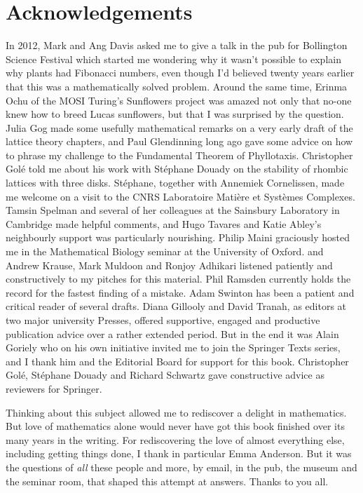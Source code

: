 

\chapter*{Acknowledgements}

In 2012, Mark and Ang Davis asked me to give a talk in the pub for Bollington Science Festival which started me wondering why it wasn't possible to explain why plants had Fibonacci numbers, even though I'd believed twenty years earlier that this was a mathematically solved problem. Around the same time, Erinma Ochu of the MOSI Turing's Sunflowers project was amazed not only that no-one knew how to breed Lucas sunflowers, but that I was surprised by the question.  
Julia Gog  made some usefully mathematical remarks on a very early draft of the lattice theory chapters, and  Paul Glendinning  long ago gave some advice on how to phrase my challenge to the Fundamental Theorem of Phyllotaxis.
Christopher Golé told me about his work with Stéphane Douady on the stability of rhombic lattices with three disks. Stéphane, together with  Annemiek Cornelissen, made me welcome on a visit to the CNRS Laboratoire Matière et Systèmes Complexes. Tamsin Spelman and several of her colleagues at the Sainsbury Laboratory in Cambridge made helpful comments, and Hugo Tavares and Katie Abley's neighbourly support was particularly nourishing.   Philip Maini graciously hosted me in the Mathematical Biology seminar at the University of Oxford. and Andrew Krause, Mark Muldoon and Ronjoy Adhikari listened patiently and constructively to my pitches for this material. Phil Ramsden currently holds the record for the fastest finding of a mistake.  Adam Swinton has been a patient and critical reader of several drafts. 
Diana Gillooly and David Tranah, as editors at two major university Presses,  offered supportive, engaged and productive publication advice over a rather extended period. But in the end it was Alain Goriely who on his own initiative invited me to join the Springer Texts series, and I thank him and the Editorial Board for support for this book. Christopher Golé, Stéphane Douady and Richard Schwartz gave constructive advice as reviewers for Springer. 


Thinking about this subject allowed me to rediscover a delight in mathematics. But love of mathematics alone would never have got this book finished over its many years in the writing. For rediscovering the love of almost everything else, including getting things done, I thank in particular Emma Anderson. But it was the questions  of \textit{all} these people and more, by email, in the pub, the museum and the seminar room, that shaped this attempt at answers.  Thanks to you all. 


